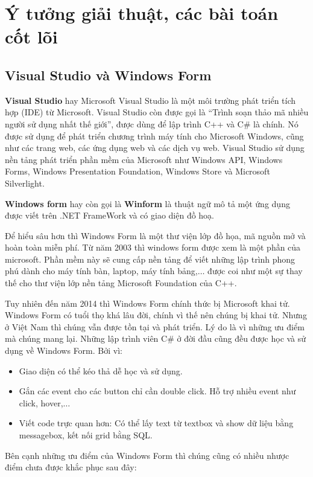 \chapter{Ý tưởng giải thuật, các bài toán cốt lõi}
\setlength{\epigraphwidth}{0.5\textwidth}

\section{Visual Studio và Windows Form}
\textbf{Visual Studio} hay Microsoft Visual Studio là một môi trường phát triển tích hợp (IDE) từ Microsoft. Visual Studio còn được gọi là ``Trình soạn thảo mã nhiều người sử dụng nhất thế giới'', được dùng để lập trình C++ và C\# là chính. Nó được sử dụng để phát triển chương trình máy tính cho Microsoft Windows, cũng như các trang web, các ứng dụng web và các dịch vụ web. Visual Studio sử dụng nền tảng phát triển phần mềm của Microsoft như Windows API, Windows Forms, Windows Presentation Foundation, Windows Store và Microsoft Silverlight.

\textbf{Windows form} hay còn gọi là \textbf{Winform} là thuật ngữ mô tả một ứng dụng được viết trên .NET FrameWork và có giao diện đồ hoạ.

Để hiểu sâu hơn thì Windows Form là một thư viện lớp đồ họa, mã nguồn mở và hoàn toàn miễn phí. Từ năm 2003 thì windows form được xem là một phần của microsoft. Phần mềm này sẽ cung cấp nền tảng để viết những lập trình phong phú dành cho máy tính bàn, laptop, máy tính bảng,$\dots$ được coi như một sự thay thế cho thư viện lớp nền tảng Microsoft Foundation của C++.

Tuy nhiên đến năm 2014 thì Windows Form chính thức bị Microsoft khai tử. Windows Form có tuổi thọ khá lâu đời, chính vì thế nên chúng bị khai tử. Nhưng ở Việt Nam thì chúng vẫn được tồn tại và phát triển. Lý do là vì những ưu điểm mà chúng mang lại. Những lập trình viên C\# ở đời đầu cũng đều được học và sử dụng về Windows Form. Bởi vì:

\begin{itemize}
	\item Giao diện có thể kéo thả dễ học và sử dụng.
	\item Gắn các event cho các button chỉ cần double click. Hỗ trợ nhiều event như click, hover,$\dots$
	\item Viết code trực quan hơn: Có thể lấy text từ textbox và show dữ liệu bằng messagebox, kết nối grid bằng SQL.
\end{itemize}

Bên cạnh những ưu điểm của Windows Form thì chúng cũng có nhiều nhược điểm chưa được khắc phục sau đây:

